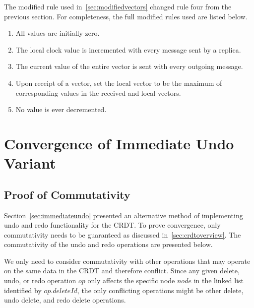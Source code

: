\documentclass[12pt,a4paper,twoside,openright]{report}
\begin{document}
The modified rule used in~\cref{sec:modifiedvectors} changed rule four from the previous section. For completeness, the full modified rules used are listed below.

\begin{enumerate}
	\item All values are initially zero.
	\item The local clock value is incremented with every message sent by a replica.
	\item The current value of the entire vector is sent with every outgoing message.
	\item Upon receipt of a vector, set the local vector to be the maximum of corresponding values in the received and local vectors.
	\item No value is ever decremented.
\end{enumerate}




\chapter{Convergence of Immediate Undo Variant}

\section{Proof of Commutativity} \label{appendix:immundoproof}

Section~\cref{sec:immediateundo} presented an alternative method of implementing undo and redo functionality for the CRDT. To prove convergence, only commutativity needs to be guaranteed as discussed in~\cref{sec:crdtoverview}. The commutativity of the undo and redo operations are presented below.

We only need to consider commutativity with other operations that may operate on the same data in the CRDT and therefore conflict. Since any given delete, undo, or redo operation $op$ only affects the specific node $node$ in the linked list identified by $op.deleteId$, the only conflicting operations might be other delete, undo delete, and redo delete operations.
						
\end{document}
